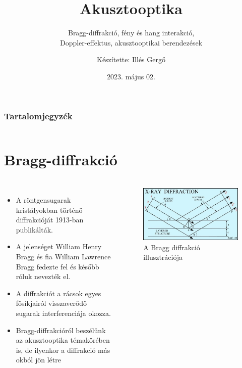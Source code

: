 \documentclass[aspectratio=169]{beamer}
\begin{document}
\title{Akusztooptika}
\subtitle{Bragg-diffrakció, fény és hang interakció,\\Doppler-effektus, akusztooptikai berendezések}
\author{Készítette: Illés Gergő}
\date{2023. május 02.}
\begin{frame}
\maketitle
\end{frame}

\begin{frame}
\frametitle{Tartalomjegyzék}

\begin{columns}
\tableofcontents
\end{columns}
\end{frame}

\section{Bragg-diffrakció}
\begin{frame}
\frametitle{\secname}
\begin{columns}
\begin{itemize}
\item A röntgensugarak kristályokban történő diffrakcióját 1913-ban publikálták.
\item A jelenséget William Henry Bragg és fia William Lawrence Bragg fedezte fel és később róluk nevezték el.
\item A diffrakciót a rácsok egyes fősíkjairól visszaverődő sugarak interferenciája okozza.
\item Bragg-diffrakcióról beszélünk az akusztooptika témakörében is, de ilyenkor a diffrakció más okból jön létre
\end{itemize}
\begin{figure}
\includegraphics[width=.9\textwidth]{xrd6.jpg}
\caption{A Bragg diffrakció illusztrációja}
\end{figure}
\end{columns}
\end{frame}
\end{document}
